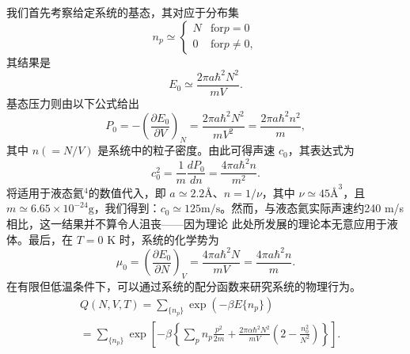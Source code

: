 我们首先考察给定系统的基态，其对应于分布集
\begin{equation}\tag{11.2.5}\label{eq:11.2.5}
n _ { p } \simeq \left\{ \begin{array}{ll} { N } & { \mathrm { f o r }  p = 0 } \\{ 0 } & { \mathrm { f o r }  p \neq 0 , } \end{array} \right.
\end{equation}
其结果是
\begin{equation}\tag{11.2.6}\label{eq:11.2.6}
E _ { 0 } \simeq \frac { 2 \pi a \hbar ^{2} N ^{2} } { m V } .
\end{equation}
基态压力则由以下公式给出
\begin{equation}\tag{11.2.7}\label{eq:11.2.7}
P _ { 0 } = - \left( \frac { \partial E _ { 0 } } { \partial V } \right) _ { N } = \frac { 2 \pi a \hbar ^{2} N ^{2} } { m V ^{2} } = \frac { 2 \pi a \hbar ^{2} n ^{2} } { m } ,
\end{equation}
其中 \(n(=N/V)\) 是系统中的粒子密度。由此可得声速 \(c_{0}\)，其表达式为
\begin{equation}\tag{11.2.8}\label{eq:11.2.8}
c _ { 0 } ^{2} = \frac { 1 } { m } \frac { d P _ { 0 } } { d n } = \frac { 4 \pi a \hbar ^{2} n } { m ^{2} } .
\end{equation}
将适用于液态氦\(^{4}\)的数值代入，即 \(a\simeq2.2\text{\AA}\)、\(n=1/\nu\)，其中 \(\nu\simeq45\text{\AA}^{3}\)，且 \(m\simeq6.65\times10^{-24}\text{g}\)，我们得到：\(c_{0}\simeq125\text{m/s}\)。然而，与液态氦实际声速约240 m/s相比，这一结果并不算令人沮丧——因为理论
此处所发展的理论本无意应用于液体。最后，在 \(T=0\) K 时，系统的化学势为
\begin{equation}\tag{11.2.9}\label{eq:11.2.9}
\mu _ { 0 } = \left( \frac { \partial E _ { 0 } } { \partial N } \right) _ { V } = \frac { 4 \pi a \hbar ^{2} N } { m V } = \frac { 4 \pi a \hbar ^{2} n } { m } .
\end{equation}
在有限但低温条件下，可以通过系统的配分函数来研究系统的物理行为。
\begin{equation}\tag{11.2.10}\label{eq:11.2.10}
\begin{array}{rl} & { Q ( N , V , T ) = \sum _ { \{ n _ { p } \} } \exp ( - \beta E \{ n _ { p } \} ) } \\& {  = \sum _ { \{ n _ { p } \} } \exp \left[ - \beta \left\{ \sum _ { p } n _ { p } \frac { p ^{2} } { 2 m } + \frac { 2 \pi \alpha \hbar ^{2} N ^{2} } { m V } \left( 2 - \frac { n _ { 0 } ^{2} } { N ^{2} } \right) \right\} \right] . } \end{array}
\end{equation}
